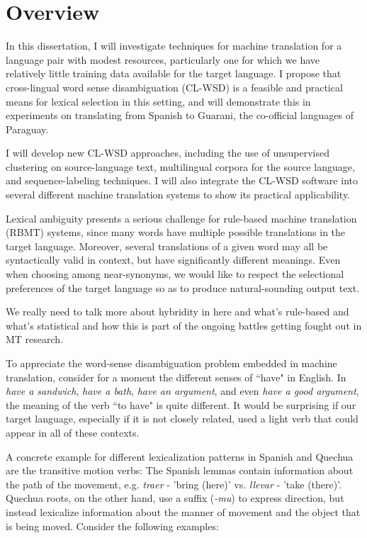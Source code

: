 \chapter{Overview}
In this dissertation, I will investigate techniques for machine translation for
a language pair with modest resources, particularly one for which we have
relatively little training data available for the target language.  I propose
that cross-lingual word sense disambiguation (CL-WSD) is a feasible and
practical means for lexical selection in this setting, and will demonstrate
this in experiments on translating from Spanish to Guarani, the co-official
languages of Paraguay.

I will develop new CL-WSD approaches, including the use of unsupervised
clustering on source-language text, multilingual corpora for the source
language, and sequence-labeling techniques. I will also integrate the CL-WSD
software into several different machine translation systems to show its
practical applicability.

Lexical ambiguity presents a serious challenge for rule-based machine
translation (RBMT) systems, since many words have multiple possible
translations in the target language. Moreover, several translations of a given
word may all be syntactically valid in context, but have significantly
different meanings. Even when choosing among near-synonyms, we would like to
respect the selectional preferences of the target language so as to produce
natural-sounding output text.

We really need to talk more about hybridity in here and what's rule-based and
what's statistical and how this is part of the ongoing battles getting fought
out in MT research.



To appreciate the word-sense disambiguation problem embedded in machine
translation, consider for a moment the different senses of ``have" in
English. In \emph{have a sandwich}, \emph{have a bath}, \emph{have an
argument}, and even \emph{have a good argument}, the meaning of the verb ``to
have" is quite different. It would be surprising if our target language,
especially if it is not closely related, used a light verb that could appear in
all of these contexts.

A concrete example for different lexicalization patterns in Spanish and Quechua
are the transitive motion verbs: The Spanish lemmas contain information about
the path of the movement, e.g. {\em traer} - 'bring (here)' vs. {\em llevar} -
'take (there)'. Quechua roots, on the other hand, use a suffix ({\em -mu}) to
express direction, but instead lexicalize information about the manner of
movement and the object that is being moved. Consider the following examples:

